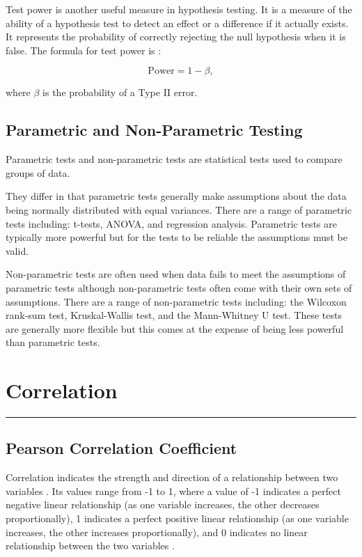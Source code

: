 \documentclass[
]{book}
\begin{document}
Test power is another useful measure in hypothesis testing. It is a measure of the ability of a hypothesis test to detect an effect or a difference if it actually exists. It represents the probability of correctly rejecting the null hypothesis when it is false. The formula for test power is \citep{swinscow}:

\[\textrm{Power}= 1-\beta,\]

where \(\beta\) is the probability of a Type II error.

\hypertarget{nonpara}{%
\section{Parametric and Non-Parametric Testing}\label{nonpara}}

Parametric tests and non-parametric tests are statistical tests used to compare groups of data.

They differ in that parametric tests generally make assumptions about the data being normally distributed with equal variances. There are a range of parametric tests including: t-tests, ANOVA, and regression analysis. Parametric tests are typically more powerful but for the tests to be reliable the assumptions must be valid.

Non-parametric tests are often used when data fails to meet the assumptions of parametric tests although non-parametric tests often come with their own sets of assumptions. There are a range of non-parametric tests including: the Wilcoxon rank-sum test, Kruskal-Wallis test, and the Mann-Whitney U test. These tests are generally more flexible but this comes at the expense of being less powerful than parametric tests.

\hypertarget{correlationchapter}{%
\chapter{Correlation}\label{correlationchapter}}

\begin{center}\rule{0.5\linewidth}{0.5pt}\end{center}

\hypertarget{pearson-correlation-coefficient}{%
\section{Pearson Correlation Coefficient}\label{pearson-correlation-coefficient}}

Correlation indicates the strength and direction of a relationship between two variables \citep{schober}. Its values range from -1 to 1, where a value of -1 indicates a perfect negative linear relationship (as one variable increases, the other decreases proportionally), 1 indicates a perfect positive linear relationship (as one variable increases, the other increases proportionally), and 0 indicates no linear relationship between the two variables \citep{swinscow2}.
\end{document}
